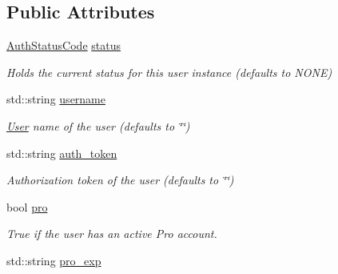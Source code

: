 \subsection*{Public Attributes}
\begin{DoxyCompactItemize}
\item 
\hyperlink{classEmojidex_1_1Service_1_1User_a01490eed8fcfc954284a058fea0a242b}{Auth\+Status\+Code} \hyperlink{classEmojidex_1_1Service_1_1User_adc84ddae4c153e0be58a904c97dd9096}{status}\hypertarget{classEmojidex_1_1Service_1_1User_adc84ddae4c153e0be58a904c97dd9096}{}\label{classEmojidex_1_1Service_1_1User_adc84ddae4c153e0be58a904c97dd9096}

\begin{DoxyCompactList}\small\item\em Holds the current status for this user instance (defaults to N\+O\+NE) \end{DoxyCompactList}\item 
std\+::string \hyperlink{classEmojidex_1_1Service_1_1User_a5bb9d033735aa9f82fa666f811f48743}{username}\hypertarget{classEmojidex_1_1Service_1_1User_a5bb9d033735aa9f82fa666f811f48743}{}\label{classEmojidex_1_1Service_1_1User_a5bb9d033735aa9f82fa666f811f48743}

\begin{DoxyCompactList}\small\item\em \hyperlink{classEmojidex_1_1Service_1_1User}{User} name of the user (defaults to \char`\"{}\char`\"{}) \end{DoxyCompactList}\item 
std\+::string \hyperlink{classEmojidex_1_1Service_1_1User_ab0dbc8fd015e529bdc295cbce221b6c3}{auth\+\_\+token}\hypertarget{classEmojidex_1_1Service_1_1User_ab0dbc8fd015e529bdc295cbce221b6c3}{}\label{classEmojidex_1_1Service_1_1User_ab0dbc8fd015e529bdc295cbce221b6c3}

\begin{DoxyCompactList}\small\item\em Authorization token of the user (defaults to \char`\"{}\char`\"{}) \end{DoxyCompactList}\item 
bool \hyperlink{classEmojidex_1_1Service_1_1User_a4e41f6c1d93b9c6cdf995904026ba761}{pro}\hypertarget{classEmojidex_1_1Service_1_1User_a4e41f6c1d93b9c6cdf995904026ba761}{}\label{classEmojidex_1_1Service_1_1User_a4e41f6c1d93b9c6cdf995904026ba761}

\begin{DoxyCompactList}\small\item\em True if the user has an active Pro account. \end{DoxyCompactList}\item 
std\+::string \hyperlink{classEmojidex_1_1Service_1_1User_a14d5753c674c9d6722d47982a309fc22}{pro\+\_\+exp}\hypertarget{classEmojidex_1_1Service_1_1User_a14d5753c674c9d6722d47982a309fc22}{}\label{classEmojidex_1_1Service_1_1User_a14d5753c674c9d6722d47982a309fc22}


\end{DoxyCompactItemize}

